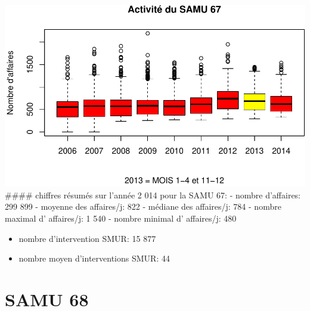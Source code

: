 \documentclass[]{article}
\newenvironment{Shaded}{\begin{snugshade}}{\end{snugshade}}
\newcommand{\KeywordTok}[1]{\textcolor[rgb]{0.13,0.29,0.53}{\textbf{{#1}}}}
\newcommand{\DataTypeTok}[1]{\textcolor[rgb]{0.13,0.29,0.53}{{#1}}}
\newcommand{\StringTok}[1]{\textcolor[rgb]{0.31,0.60,0.02}{{#1}}}
\newcommand{\NormalTok}[1]{{#1}}
\begin{document}
\begin{Shaded}
\end{Shaded}

\includegraphics{samu_files/figure-latex/ac_67-1.pdf} \#\#\#\# chiffres
résumés sur l'année 2 014 pour la SAMU 67: - nombre d'affaires: 299 899
- moyenne des affaires/j: 822 - médiane des affaires/j: 784 - nombre
maximal d' affaires/j: 1 540 - nombre minimal d' affaires/j: 480

\begin{itemize}
\itemsep1pt\parskip0pt
\item
  nombre d'intervention SMUR: 15 877
\item
  nombre moyen d'interventions SMUR: 44
\end{itemize}

\section{SAMU 68}\label{samu-68}
\end{document}
